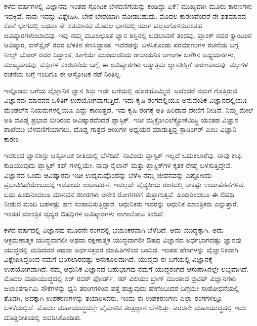 
ಕಳೆದ  ವರ್ಷಗಳಲ್ಲಿ ವಿಜ್ಞಾನವು ಇಂತಹ ಸ್ಪೋಟಕ ಬೆಳವಣಿಗೆಯನ್ನು ಕಂಡಿದ್ದು ಏಕೆ? ಮುಖ್ಯವಾಗಿ ಮೂರು ಕಾರಣಗಳು ಇದಕ್ಕಿವೆ. ನಾವು ಇವನ್ನು ವಿಶ್ಲೇಷಿಸಿ, ಬೇರೆ ಬೇರೆಯಾಗಿ ನೋಡಬಹುದು. ಮೊದಲ ಕಾರಣವೆಂದರೆ ನೇ ಶತಮಾನದ ಕೊನೆ ಭಾಗದಲ್ಲಿ ಅಥವಾ ನೇ ಶತಮಾನದ ಮೊದಲ ಭಾಗದಲ್ಲಿ ಯುಗ ಪಲ್ಲಟಗೊಳಿಸುವಂತಹ ಆವಿಷ್ಕಾರಗಳುಂಟಾದವು. ಇವು ನಮ್ಮ ಮೂಲಭೂತ ಜ್ಞಾನ ಶಿಸ್ತಿನಲ್ಲಿ ಬದಲಾವಣೆ ತಂದವು. ಪ್ಲಾಂಕ್ ರವರ ಕ್ವಾಂಟಂನ ಆವಿಷ್ಕಾರ, ಐನ್‍ಸ್ಟೈನ್ ರವರ ಬೆಳಕಿನ ಕಣಸಿದ್ಧಾಂತ, ಇವೆರಡನ್ನು ಬಳಸಿಕೊಂಡು ಪರಮಾಣುಗಳ ರಚನೆಯ ಬಗ್ಗೆ ನೀಲ್ಸ್ ಬೋರ್ ರವರ ಸಿದ್ಧಾಂತ, ಹೀಗೆಯೇ ಮುಂದುವರಿದು ರಾಸಾಯನಿಕ ಅಣುಗಳ ಬಗೆಗಿನ ಅಧ್ಯಯನಗಳು, ಮುಖ್ಯವಾದವು. ವಸ್ತುಗಳ ಸಂರಚನೆಯ ಬಗ್ಗೆ, ಈ ಆವಿಷ್ಕಾರಗಳು ಅತ್ಯುತ್ತಮ ಜ್ಞಾನಶಿಸ್ತಿಗೆ ಕಾರಣವಾದವು. ವಸ್ತುಗಳ ರಚನೆಯ ಬಗ್ಗೆ ಇಂದಿಗೂ ಈ ಆಸ್ಫೋಟಕ ನಡೆ ನಿಂತಿಲ್ಲ.

ಇನ್ನೊಂದು ಬಗೆಯ ವೈಜ್ಞಾನಿಕ ಜ್ಞಾನ ಶಿಸ್ತು ಇದೇ ಬಗೆಯಲ್ಲಿ ಹೊರಹೊಮ್ಮಿದೆ. ಅದೆಂದರೆ ನಮಗೆ ಗೊತ್ತಿರುವ ವಿಜ್ಞಾನವು ಮಾನವನ ಒಳಿತಿಗೆ ಉಪಯೋಗವಾಗುತ್ತಿದೆ. ಇದು ಕೃಷಿ ರಂಗದಲ್ಲಿಯೂ ಅನುವಂಶಿಕ ವಿಜ್ಞಾನದಲ್ಲಿಯೂ ಮೆಂಡಲ್‍ನ ನಿಯಮಗಳಲ್ಲಿಯೂ ಎದ್ದು ಕಾಣುತ್ತದೆ. ಇವು ಕೃಷಿ ರಂಗಕ್ಕೆ ಅತಿ ಹಿರಿದಾದ ದೇಣಿಗೆ ನೀಡಿವೆ. ನಿಮ್ಮ ಮೇಲೆ ಅತಿ ದೊಡ್ಡ ಪ್ರಭಾವ ಬೀರಿರುವ ಆವಿಷ್ಕಾರವೆಂದರೆ ಪ್ಲಾಸ್ಟಿಕ್. ಇಡೀ ಮೈಕ್ರೋಎಲೆಕ್ಟ್ರೋಕೆಮಿಸ್ಟ್ರಿ ಯಂತಹ ವಿಜ್ಞಾನ ಶಾಖೆಯು ಬೆಳವಣಿಗೆಯಾಗಲು, ದೊಡ್ಡ ಗಾತ್ರದ ಅಣುಗಳ ಅಧ್ಯಯನ ಮಾಡುತ್ತಿದ್ದ ಸ್ಟಾಡಿಂಗರ್ ಎಂಬ ವಿಜ್ಞಾನಿ ಕಾರಣ.

ಇದರಿಂದ ಜ್ಞಾನಶಿಸ್ತು ಆಸ್ಫೋಟಕ ರೀತಿಯಲ್ಲಿ ಬೆಳೆದಿದೆ. ನಾವಿಂದು ಪ್ಲಾಸ್ಟಿಕ್ ಇಲ್ಲದೆ ಬದುಕಲಾರೆವು. ನಾವು ಕಾಫಿ ಕುಡಿಯುವುದು ಪ್ಲಾಸ್ಟಿಕ್ ಕಪ್ ಗಳಲ್ಲಿಯೇ. ನಾವು ನೈಲಾನ್ ಮತ್ತು ಪ್ಲಾಸ್ಟಿಕ್‍ಗಳ ಕೃತಕ ರೇಷ್ಮೆ ಬಳಸುತ್ತಿದ್ದೇವೆ. ವಿಜ್ಞಾನದ ಒಂದು ಆವಿಷ್ಕಾರವು ಇಡೀ ಉದ್ಯಮವೊಂದನ್ನು ಬೆಳೆಸಿ ನಮ್ಮ ಜೀವನವನ್ನು ಎಷ್ಟೋಂದು ಪ್ರಭಾವಿಸಿದೆಯೆಂಬುದಕ್ಕೆ ಇದೊಂದು ಉದಾಹರಣೆ. ಇದಲ್ಲದೇ ವೈದ್ಯಕೀಯ ರಂಗದಲ್ಲಿ ಸಾಕಷ್ಟು ಉದಾಹರಣೆಗಳಿವೆ. ಬಹು ಹಿಂದಿನಿಂದಲೂ ಮಾನವನ ಶರೀರಗಳು ಅನೇಕ ರೋಗಗಳಿಗೆ ತುತ್ತಾಗುತ್ತಿವೆ. ಹಿಂದಿನಿಂದಲೂ ಈ ಔಷಧಿ ನೀಡುವ ಮಂದಿ ಬಹಳಷ್ಟು ಹಣ ಸಂಪಾದಿಸುತ್ತಿದ್ದಾರೆ. ಆಧುನಿಕರು ಇವರನ್ನು ಆಧುನಿಕ ಮಾಂತ್ರಿಕರು ಎನ್ನುತ್ತಾರೆ. ಇಂತಹ ಮಾಂತ್ರಿಕ ವೈದ್ಯರ ಔಷಧಿಗಳ ಆವಿಷ್ಕಾರಗಳು ನಾಗಾಲೋಟ ಕಂಡಿವೆ.

ಕಳೆದ  ವರ್ಷದಲ್ಲಿ ವಿಜ್ಞಾನವು ಮೂರನೇ ರಂಗದಲ್ಲಿ ಭಯಂಕರವಾಗಿ ಬೆಳೆದಿದೆ. ಅದು ಯುದ್ಧಕ್ಕಾಗಿ. ಅದು ಆಕ್ರಮಣಾತ್ಮಕ ಯುದ್ಧವಾಗಲೀ ಅಥವಾ ರಕ್ಷಣಾತ್ಮಕ ಯುದ್ಧವಾಗಲೀ ಔಷಧ ವಿಜ್ಞಾನದ ಅರ್ಧಭಾಗದಷ್ಟು ಜ್ಞಾನವು ಯುದ್ಧದಲ್ಲಿ ಮಡಿದವರ ಅಥವಾ ಅರ್ಧಸತ್ತವರ ಮಾಹಿತಿಗಳಿಂದ ಬಂದಿದೆ. ಇಂತಹ ಹೆಣಗಳನ್ನು ವೈಜ್ಞಾನಿಕವಾಗಿ ವಿಶ್ಲೇಷಿಸಿದ್ದರಿಂದ ನಮಗೆ ಭರಿಸಲಾರದಷ್ಟು ಅನುಕೂಲವಾಗಿದೆ. ಯುದ್ಧವು ಈ ಬಗೆಯಲ್ಲಿ ವಿಜ್ಞಾನಕ್ಕೆ ಉಪಯೋಗವಾಗಿದೆ. ನಮ್ಮ ಆಧುನಿಕ ವಿಜ್ಞಾನದ ಬಹುಭಾಗವು ನಮಗೆ ಯುದ್ಧರಂಗದ ಆಸುಪಾಸಿನಲ್ಲೇ ಲಭ್ಯವಾಗಿದೆ. ಮೊದಲ ಮಹಾಯುದ್ಧದಲ್ಲಿ ಸರ್ ರದರ್ ಫೋರ್ಡ್, ಸರ್ ವಿಲಿಯಂ ಬ್ರಾಗ್ ಮುಂತಾದ ಬ್ರಿಟಿಷ್ ವಿಜ್ಞಾನಿಗಳು ಜಲಾಂತರ್ಗಾಮಿ ನೌಕೆಗಳನ್ನು ಧ್ವನಿ ತರಂಗಗಳಿಂದ ಪತ್ತೆ ಹಚ್ಚುವುದು ಹೇಗೆಂಬುದರ ಬಗ್ಗೆಯೇ ಸಂಶೋಧನೆಯಲ್ಲಿ ತೊಡಗಿ, ಅದಕ್ಕಾಗಿ ಉಪಕರಣಗಳನ್ನು ತಯಾರಿಸಿದರು. ಇಂದು ಈ ಉಪಕರಣಗಳು ಎಲ್ಲಾ ರಂಗಗಳಲ್ಲೂ ಬಳಕೆಯಲ್ಲಿದೆ. ಮೊದಲ ಮಹಾಯುದ್ಧದಲ್ಲೇ ವೈಮಾನಿಕ ತಂತ್ರಜ್ಞಾನ ಬೆಳೆದಿತ್ತು. ಎರಡನೇ ಮಹಾಯುದ್ಧದಲ್ಲಿ ಇದು ದೊಡ್ಡರೀತಿಯಲ್ಲಿ ಆವರಿಸಿಕೊಂಡಿತು.

